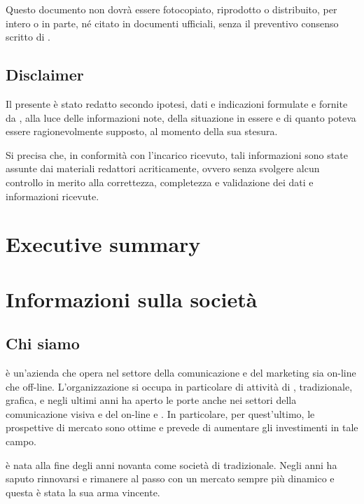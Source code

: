 Questo documento non dovrà essere fotocopiato, riprodotto o distribuito, per intero o in parte, né citato in documenti ufficiali, senza il preventivo consenso scritto di \customer.

\section{Disclaimer}
Il presente  è stato redatto secondo ipotesi, dati e indicazioni formulate e fornite da \customer, alla luce delle informazioni note, della situazione in essere e di quanto poteva essere ragionevolmente supposto, al momento della sua stesura.

Si precisa che, in conformità con l'incarico ricevuto, tali informazioni sono state assunte dai materiali redattori acriticamente, ovvero senza svolgere alcun controllo in merito alla correttezza, completezza e validazione dei dati e informazioni ricevute.

\chapter{Executive summary}\label{sec:summary}

\chapter{Informazioni sulla società}\label{sec:whoweare}

\section{Chi siamo}
\customer è un'azienda che opera nel settore della comunicazione e del marketing sia on-line che off-line. 
L'organizzazione si occupa in particolare di attività di ,  tradizionale, grafica, e negli ultimi anni ha aperto le porte anche nei settori della comunicazione visiva e del \mktg on-line e . In particolare, per quest'ultimo, le prospettive di mercato sono ottime e \customer prevede di aumentare gli investimenti in tale campo.

\customer è nata alla fine degli anni novanta come società di  tradizionale. Negli anni ha saputo rinnovarsi e rimanere al passo con un mercato sempre più dinamico e questa è stata la sua arma vincente.

